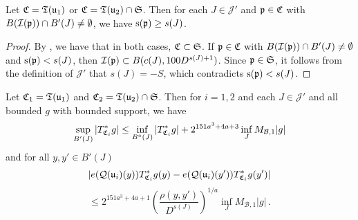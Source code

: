     \begin{lemma}
        \label{scales-impacting-interval}
        \leanok
        Let ${\mathfrak C} = {\mathfrak T}({\mathfrak u}_1)$ or ${\mathfrak C} = {\mathfrak T}({\mathfrak u}_2) \cap \mathfrak{S}$. Then for each $J \in \mathcal{J}'$ and ${\mathfrak p} \in {\mathfrak C}$ with $B({\mathcal{I}}({\mathfrak p})) \cap B'(J) \neq \emptyset$, we have ${\mathrm{s}}({\mathfrak p}) \ge s(J)$.
    \end{lemma}

    \begin{proof}
        \leanok
        By , we have that in both cases, ${\mathfrak C} \subset \mathfrak{S}$. If ${\mathfrak p} \in {\mathfrak C}$ with $B({\mathcal{I}}({\mathfrak p})) \cap B'(J) \neq \emptyset$ and ${\mathrm{s}}({\mathfrak p}) < s(J)$, then ${\mathcal{I}}({\mathfrak p}) \subset B(c(J), 100 D^{s(J) + 1})$. Since ${\mathfrak p} \in \mathfrak{S}$, it follows from the definition of $\mathcal{J}'$ that $s(J) = -S$, which contradicts ${\mathrm{s}}({\mathfrak p}) < s(J)$.
    \end{proof}

    \begin{lemma}
        \label{global-tree-control-1}
        \leanok
        Let ${\mathfrak C}_1 = {\mathfrak T}({\mathfrak u}_1)$ and ${\mathfrak C}_2 = {\mathfrak T}({\mathfrak u}_2) \cap \mathfrak{S}$. Then for $i = 1,2$ and each $J \in \mathcal{J}'$ and all bounded $g$ with bounded support, we have
        \begin{align}
            \label{TreeUB}
            \sup_{B'(J)} |T_{{\mathfrak C}_i}^*g| \leq \inf_{B^\circ{}(J)} |T^*_{{\mathfrak C}_i} g| + 2^{151a^3+4a+3} \inf_{J} M_{\mathcal{B}, 1} |g|
        \end{align}
        and for all $y,y' \in B'(J)$
        $$
            |e({\mathcal{Q}}({\mathfrak u}_i)(y)) T_{{\mathfrak C}_i}^* g(y) - e({\mathcal{Q}}({\mathfrak u}_i)(y')) T_{{\mathfrak C}_i}^* g(y')|
        $$
        \begin{equation}
            \label{TreeHolder}
             \le 2^{151a^3+4a+1} \left(\frac{\rho(y,y')}{D^{s(J)}}\right)^{1/a} \inf_J M_{\mathcal{B},1} |g|\,.
        \end{equation}
    \end{lemma}

